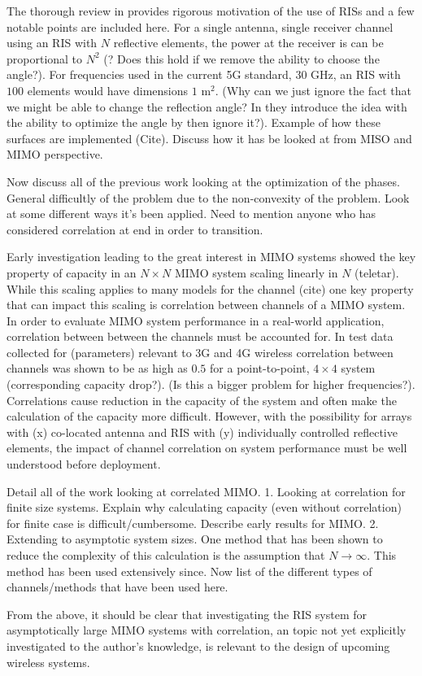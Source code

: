 \documentclass[12pt,a4paper]{report}
\begin{document}
The thorough review in \cite{basar2019wireless} provides rigorous motivation of the use of RISs and a few notable points are included here.
For a single antenna, single receiver channel using an RIS with $N$ reflective elements, the power at the receiver is can be proportional to $N^2$ (? Does this hold if we remove the ability to choose the angle?).
For frequencies used in the current 5G standard, 30 GHz, an RIS with $100$ elements would have dimensions $1$ $\text{m}^2$.
(Why can we just ignore the fact that we might be able to change the reflection angle? In \cite{basar2019wireless} they introduce the idea with the ability to optimize the angle by then ignore it?).
Example of how these surfaces are implemented (Cite).
Discuss how it has be looked at from MISO and MIMO perspective.
\par
Now discuss all of the previous work looking at the optimization of the phases. 
General difficultly of the problem due to the non-convexity of the problem. Look at some different ways it's been applied.
Need to mention anyone who has considered correlation at end in order to transition. 
\par
Early investigation leading to the great interest in MIMO systems showed the key property of capacity in an $N \times N$ MIMO system scaling linearly in $N$ (teletar). While this scaling applies to many models for the channel (cite) one key property that can impact this scaling is correlation between channels of a MIMO system.
In order to evaluate MIMO system performance in a real-world application, correlation between between the channels must be accounted for. In test data collected for (parameters) relevant to 3G and 4G wireless correlation between channels was shown to be as high as $0.5$ for a point-to-point, $4 \times 4$ system \cite{martin2000multiple} (corresponding capacity drop?). (Is this a bigger problem for higher frequencies?). Correlations cause reduction in the capacity of the system and often make the calculation of the capacity more difficult. However, with the possibility for arrays with (x) co-located antenna and RIS with (y) individually controlled reflective elements, the impact of channel correlation on system performance must be well understood before deployment. 
\par
Detail all of the work looking at correlated MIMO. 
1. Looking at correlation for finite size systems.
Explain why calculating capacity (even without correlation) for finite case is difficult/cumbersome. Describe early results for MIMO.
2. Extending to asymptotic system sizes. 
One method that has been shown to reduce the complexity of this calculation is the assumption that $N \rightarrow \infty$. This method has been used 
extensively since. 
Now list of the different types of channels/methods that have been used here. 
\cite{loyka2001channel}
\par
From the above, it should be clear that investigating the RIS  system for 
asymptotically large MIMO systems with correlation, an topic not yet explicitly investigated to the author's knowledge, is relevant to the design of upcoming wireless systems.
\end{document}
